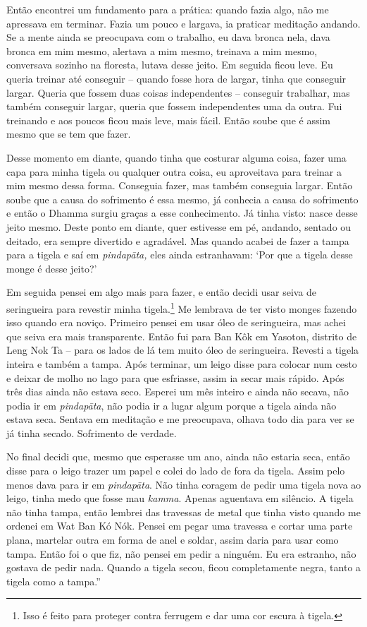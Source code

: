 Então encontrei um fundamento para a prática: quando fazia algo, não me
apressava em terminar. Fazia um pouco e largava, ia praticar meditação
andando. Se a mente ainda se preocupava com o trabalho, eu dava bronca
nela, dava bronca em mim mesmo, alertava a mim mesmo, treinava a mim
mesmo, conversava sozinho na floresta, lutava desse jeito. Em seguida
ficou leve. Eu queria treinar até conseguir -- quando fosse hora de
largar, tinha que conseguir largar. Queria que fossem duas coisas
independentes -- conseguir trabalhar, mas também conseguir largar,
queria que fossem independentes uma da outra. Fui treinando e aos poucos
ficou mais leve, mais fácil. Então soube que é assim mesmo que se tem
que fazer.

Desse momento em diante, quando tinha que costurar alguma coisa, fazer
uma capa para minha tigela ou qualquer outra coisa, eu aproveitava para
treinar a mim mesmo dessa forma. Conseguia fazer, mas também conseguia
largar. Então soube que a causa do sofrimento é essa mesmo, já conhecia
a causa do sofrimento e então o Dhamma surgiu graças a esse
conhecimento. Já tinha visto: nasce desse jeito mesmo. Deste ponto em
diante, quer estivesse em pé, andando, sentado ou deitado, era sempre
divertido e agradável. Mas quando acabei de fazer a tampa para a tigela
e saí em \emph{pindapāta,} eles ainda estranhavam: `Por que a tigela
desse monge é desse jeito?'

Em seguida pensei em algo mais para fazer, e então decidi usar seiva de
seringueira para revestir minha tigela.\footnote{Isso é feito para
  proteger contra ferrugem e dar uma cor escura à tigela.} Me lembrava
de ter visto monges fazendo isso quando era noviço. Primeiro pensei em
usar óleo de seringueira, mas achei que seiva era mais transparente.
Então fui para Ban Kôk em Yasoton, distrito de Leng Nok Ta -- para os
lados de lá tem muito óleo de seringueira. Revesti a tigela inteira e
também a tampa. Após terminar, um leigo disse para colocar num cesto e
deixar de molho no lago para que esfriasse, assim ia secar mais rápido.
Após três dias ainda não estava seco. Esperei um mês inteiro e ainda não
secava, não podia ir em \emph{pindapāta}, não podia ir a lugar algum
porque a tigela ainda não estava seca. Sentava em meditação e me
preocupava, olhava todo dia para ver se já tinha secado. Sofrimento de
verdade.

No final decidi que, mesmo que esperasse um ano, ainda não estaria seca,
então disse para o leigo trazer um papel e colei do lado de fora da
tigela. Assim pelo menos dava para ir em \emph{pindapāta}. Não tinha
coragem de pedir uma tigela nova ao leigo, tinha medo que fosse mau
\emph{kamma}. Apenas aguentava em silêncio. A tigela não tinha tampa,
então lembrei das travessas de metal que tinha visto quando me ordenei
em Wat Ban Kó Nók. Pensei em pegar uma travessa e cortar uma parte
plana, martelar outra em forma de anel e soldar, assim daria para usar
como tampa. Então foi o que fiz, não pensei em pedir a ninguém. Eu era
estranho, não gostava de pedir nada. Quando a tigela secou, ficou
completamente negra, tanto a tigela como a tampa.''

